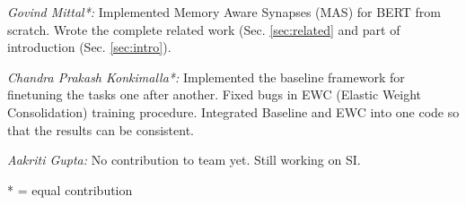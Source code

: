 \documentclass[11pt,a4paper]{article}
\begin{document}
\textit{Govind Mittal*:} Implemented Memory Aware Synapses (MAS) for BERT from scratch. Wrote the complete related work (Sec. \ref{sec:related} and part of introduction (Sec. \ref{sec:intro}). 

\textit{Chandra Prakash Konkimalla*:} Implemented the baseline framework for finetuning the tasks one after another. Fixed bugs in EWC (Elastic Weight Consolidation) training procedure. Integrated Baseline and EWC into one code so that the results can be consistent. 

\textit{Aakriti Gupta:} No contribution to team yet. Still working on SI.

* = equal contribution








\end{document}
